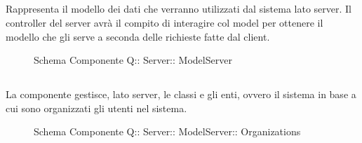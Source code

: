 \subsection{}
Rappresenta il modello dei dati che verranno utilizzati dal sistema lato server. 
Il controller del server avrà il compito di interagire col model per ottenere il modello che gli serve a seconda delle richieste fatte dal client.
\begin{figure}[H]
\centering
\noindent{}
\caption[Schema Componente Quizzipedia::Server::ModelServer]{Schema Componente Q:: Server:: ModelServer}
\end{figure}
\subsection{}
La componente gestisce, lato server, le classi e gli enti, ovvero il sistema in base a cui sono organizzati gli utenti nel sistema.
\begin{figure}[H]
\centering
\noindent{}
\caption[Schema Componente Quizzipedia::Server::ModelServer::Organizations]{Schema Componente Q:: Server:: ModelServer:: Organizations}
\end{figure}
